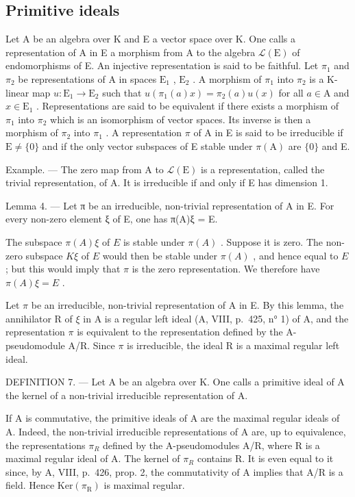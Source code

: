 \subsection{Primitive ideals}

Let A be an algebra over K and E a vector space over K. One calls a representation of A in E a morphism from A to the algebra \(\mathcal{L}(\mathrm{E})\) of endomorphisms of E. An injective representation is said to be faithful. Let \(\pi_1\) and \(\pi_2\) be representations of A in spaces \(\mathrm{E}_1\) , \(\mathrm{E}_2\) . A morphism of \(\pi_1\) into \(\pi_2\) is a K-linear map \(u: \mathrm{E}_1 \to \mathrm{E}_2\) such that \(u(\pi_1(a)x) = \pi_2(a)u(x)\) for all \(a \in \mathrm{A}\) and \(x \in \mathrm{E}_1\) . Representations are said to be equivalent if there exists a morphism of \(\pi_1\) into \(\pi_2\) which is an isomorphism of vector spaces. Its inverse is then a morphism of \(\pi_2\) into \(\pi_1\) . A representation \(\pi\) of A in E is said to be irreducible if \(\mathrm{E} \neq \{0\}\) and if the only vector subspaces of E stable under \(\pi(\mathrm{A})\) are \(\{0\}\) and E.

Example. --- The zero map from A to \(\mathcal{L}(\mathrm{E})\) is a representation, called the trivial representation, of A. It is irreducible if and only if E has dimension 1.

Lemma 4. --- Let π be an irreducible, non-trivial representation of A in E. For every non-zero element ξ of E, one has π(A)ξ = E.

The subspace \(\pi(A)\xi\) of \(E\) is stable under \(\pi(A)\) . Suppose it is zero. The non-zero subspace \(K\xi\) of \(E\) would then be stable under \(\pi(A)\) , and hence equal to \(E\) ; but this would imply that \(\pi\) is the zero representation. We therefore have \(\pi(A)\xi = E\) .

Let \(\pi\) be an irreducible, non-trivial representation of A in E. By this lemma, the annihilator R of \(\xi\) in A is a regular left ideal (A, VIII, p.~425, n° 1) of A, and the representation \(\pi\) is equivalent to the representation defined by the A-pseudomodule A/R. Since \(\pi\) is irreducible, the ideal R is a maximal regular left ideal.

DEFINITION 7. --- Let A be an algebra over K. One calls a primitive ideal of A the kernel of a non-trivial irreducible representation of A.

If A is commutative, the primitive ideals of A are the maximal regular ideals of A. Indeed, the non-trivial irreducible representations of A are, up to equivalence, the representations \(\pi_{R}\) defined by the A-pseudomodules A/R, where R is a maximal regular ideal of A. The kernel of \(\pi_{R}\) contains R. It is even equal to it since, by A, VIII, p.~426, prop. 2, the commutativity of A implies that A/R is a field. Hence \(\text{Ker}(\pi_{\text{R}})\) is maximal regular.

